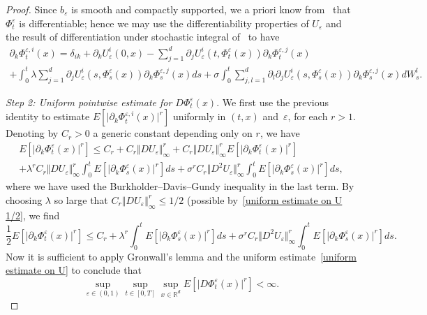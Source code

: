 \documentclass[a4paper,10pt]{article}
\newcommand\1{\mathbbm{1}}
\newcommand{\eps}{\varepsilon}
\numberwithin{equation}{section}
\begin{document}
\begin{proof}
Since $b_{\eps}$ is smooth and compactly supported, we a priori know from~\cite{KUNITA84} that $\Phi^{\eps}_t$ is differentiable; hence we may use the differentiability properties of $U_{\eps}$ and the result of differentiation under stochastic integral of~\cite{KUNITA84} to have
\begin{multline}
\label{formula_Dvarphi}
\partial_{k}\Phi^{\eps,i}_{t}(x) =\delta_{ik}+\partial_{k}U_{\eps}^{i}(0,x)  -\sum_{j=1}^{d} \partial_{j}U_{\eps}^{i}(t,\Phi^{\eps}_t(x)) 
\partial_{k}\Phi^{\eps,j}_{t}(x)  \\
+\int_{0}^{t}\lambda\sum_{j=1}^{d}\partial_{j}U_{\eps}^{i}(s,\Phi^{\eps}_s(x)) \partial_{k}\Phi^{\eps,j}_{s}(x) ds
+\sigma\int_{0}^{t}\sum_{j,l=1}^{d}\partial_{l}\partial_{j}U_{\eps}^{i}(s,\Phi^{\eps}_s(x))  \partial_{k}\Phi^{\eps,j}_{s}(x)  dW_{s}^{l}.
\end{multline}

\emph{Step 2: Uniform pointwise estimate for $D\Phi^{\eps}_t(x)$}. We first use the previous identity to estimate $E[\vert \partial_{k}\Phi^{\eps,i}_{t}(x) \vert ^{r}]
$ uniformly in $(  t,x)  $ and~$\eps$, for each $r>1$. Denoting by $C_{r}>0$ a generic constant depending only on $r$, we have
\begin{multline*}
E[ \vert \partial_{k}\Phi^{\eps}_{t}(x) \vert^{r}] \leq C_{r}+C_{r} \Vert DU_{\varepsilon} \Vert_{\infty}^{r}+C_{r} \Vert DU_{\varepsilon} \Vert
_{\infty}^{r} E [ \vert \partial_{k}\Phi^{\eps}_{t}(x) \vert^{r} ]  \\
 +\lambda^{r}C_{r} \Vert DU_{\varepsilon} \Vert _{\infty}^{r}
\int_{0}^{t}E [ \vert \partial_{k}\Phi^{\eps}_{s}(x) \vert^{r}]  ds
 +\sigma^{r}C_{r} \Vert D^{2}U_{\varepsilon} \Vert _{\infty}^{r}
\int_{0}^{t} E[ \vert \partial_{k}\Phi^{\eps}_{s}(x) \vert^{r}]  ds ,
\end{multline*}
where we have used the Burkholder--Davis--Gundy inequality in the last term. By choosing $\lambda$ so large that $C_{r}\left\Vert DU_{\varepsilon}\right\Vert _{\infty}^{r}\leq 1/2$ (possible by~\eqref{uniform estimate on U 1/2}, we find
\begin{equation*}
\frac{1}{2} E[ \vert \partial_{k}\Phi^{\eps}_{t}(x) \vert^{r}] \leq C_{r} 
 +\lambda^{r} \int_{0}^{t}E [ \vert \partial_{k}\Phi^{\eps}_{s}(x) \vert^{r}] ds
 +\sigma^{r} C_{r} \Vert D^{2}U_{\varepsilon}\Vert _{\infty}^{r}
\int_{0}^{t} E[ \vert \partial_{k}\Phi^{\eps}_{s}(x) \vert^{r} ]  ds .
\end{equation*}
Now it is sufficient to apply Gronwall's lemma and the uniform estimate~\eqref{uniform estimate on U} to conclude that
\begin{equation}
\sup_{\eps\in (0,1)  }\sup_{t\in [0,T]  } 
\sup_{x\in\mathbb{R}^{d}}E [ \vert D\Phi^{\eps}_{t}(x) \vert^{r}] <\infty .\label{uniform estimate on phi} 
\end{equation}


\end{proof}
\end{document}
